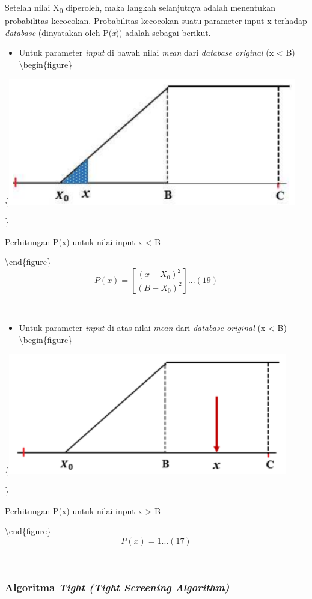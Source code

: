 \documentclass[
]{book}
\providecommand{\tightlist}{%
  \setlength{\itemsep}{0pt}\setlength{\parskip}{0pt}}
\begin{document}
Setelah nilai X\textsubscript{0} diperoleh, maka langkah selanjutnya adalah menentukan probabilitas kecocokan. Probabilitas kecocokan suatu parameter input x terhadap \emph{database} (dinyatakan oleh P(\emph{x})) adalah sebagai berikut.

\begin{itemize}
\tightlist
\item
  Untuk parameter \emph{input} di bawah nilai \emph{mean} dari \emph{database original} (x \textless{} B)
  \textbackslash begin\{figure\}
\end{itemize}

\{\centering \includegraphics[width=0.5\linewidth]{images/screening/kecilB2}

\}

\caption{Perhitungan P(x) untuk nilai input x < B}

\label{fig:unnamed-chunk-27}
\textbackslash end\{figure\}
\[P(x) = \left[\frac{(x-X_0)^2}{(B-X_0)^2}\right] ...(19)\]

~

\begin{itemize}
\tightlist
\item
  Untuk parameter \emph{input} di atas nilai \emph{mean} dari \emph{database original} (x \textless{} B)
  \textbackslash begin\{figure\}
\end{itemize}

\{\centering \includegraphics[width=0.5\linewidth]{images/screening/besarB2}

\}

\caption{Perhitungan P(x) untuk nilai input x > B}

\label{fig:unnamed-chunk-28}
\textbackslash end\{figure\}
\[P(x) = 1...(17)\]

~

\hypertarget{algoritma-tight-tight-screening-algorithm}{%
\subsubsection{\texorpdfstring{Algoritma \emph{Tight (Tight Screening Algorithm)}}{Algoritma Tight (Tight Screening Algorithm)}}\label{algoritma-tight-tight-screening-algorithm}}
\end{document}
